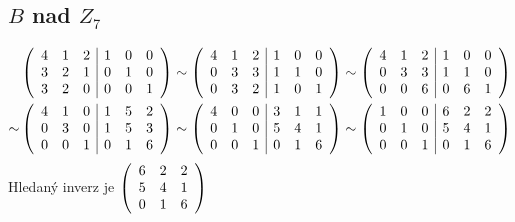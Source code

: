 \documentclass[a4paper]{article}
\begin{document}
\subsection{$B$ nad $Z_7$}%
\begin{align*}
    &\left(
    \begin{array}{c c c | c c c }
        4 & 1 & 2 & 1 & 0 & 0 \\
        3 & 2 & 1 & 0 & 1 & 0 \\
        3 & 2 & 0 & 0 & 0 & 1
    \end{array}
    \right)
    \sim
    \left(
    \begin{array}{c c c | c c c }
        4 & 1 & 2 & 1 & 0 & 0 \\
        0 & 3 & 3 & 1 & 1 & 0 \\
        0 & 3 & 2 & 1 & 0 & 1
    \end{array}
    \right)
    \sim
    \left(
    \begin{array}{c c c | c c c }
        4 & 1 & 2 & 1 & 0 & 0\\
        0 & 3 & 3 & 1 & 1 & 0\\
        0 & 0 & 6 & 0 & 6 & 1
    \end{array}
    \right)\\
    \sim
    &\left(
    \begin{array}{c c c | c c c }
        4 & 1 & 0 & 1 & 5 & 2\\
        0 & 3 & 0 & 1 & 5 & 3\\
        0 & 0 & 1 & 0 & 1 & 6
    \end{array}
    \right)
    \sim
    \left(
    \begin{array}{c c c | c c c }
        4 & 0 & 0 & 3 & 1 & 1\\
        0 & 1 & 0 & 5 & 4 & 1\\
        0 & 0 & 1 & 0 & 1 & 6
    \end{array}
    \right)
    \sim
    \left(
    \begin{array}{c c c | c c c }
        1 & 0 & 0 & 6 & 2 & 2\\
        0 & 1 & 0 & 5 & 4 & 1\\
        0 & 0 & 1 & 0 & 1 & 6
    \end{array}
    \right)
\end{align*}
Hledaný inverz je
$
\left(
\begin{array}{c c c}
    6 & 2 & 2\\
    5 & 4 & 1\\
    0 & 1 & 6
\end{array}
\right)
$
\end{document}
